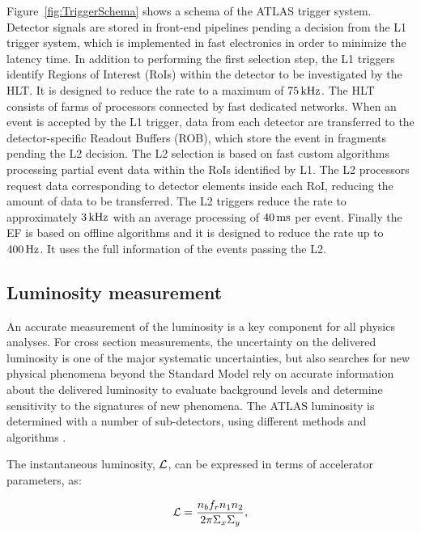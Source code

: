 Figure~\ref{fig:TriggerSchema} shows a schema of the ATLAS trigger system.
Detector signals are stored in front-end pipelines pending a decision from the L1 trigger system, which is implemented in fast electronics in order to minimize the latency time.
In addition to performing the first selection step, the L1 triggers identify Regions of Interest (RoIs) within the detector to be investigated by the HLT.
It is designed to reduce the rate to a maximum of $\unit[75]{kHz}$.
The HLT consists of farms of processors connected by fast dedicated networks.
When an event is accepted by the L1 trigger, data from each detector are transferred to the detector-specific Readout Buffers (ROB), which store the event in fragments pending the L2 decision.
The L2 selection is based on fast custom algorithms processing partial event data within the RoIs identified by L1.
The L2 processors request data corresponding to detector elements inside each RoI, reducing the amount of data to be transferred.
The L2 triggers reduce the rate to approximately $\unit[3]{kHz}$ with an average processing of $\unit[40]{ms}$ per event.
Finally the EF is based on offline algorithms and it is designed to reduce the rate up to $\unit[400]{Hz}$. 
It uses the full information of the events passing the L2.


\subsection{Luminosity measurement}
    \label{subsec:LuminosityMeasurement}

An accurate measurement of the luminosity is a key component for all physics analyses. 
For cross section measurements, the uncertainty on the delivered luminosity is one of the major systematic uncertainties, but also searches for new physical phenomena beyond the Standard Model rely on accurate information about the delivered luminosity to evaluate background levels and determine sensitivity to the signatures of new phenomena.
The ATLAS luminosity is determined with a number of sub-detectors, using different methods and algorithms \cite{Aad:2013ucp}.

The instantaneous luminosity, $\mathcal{L}$, can be expressed in terms of accelerator parameters, as:

\begin{equation}
  \InstLumi = \frac{n_{b} f_{r} n_{1} n_{2}}{2\pi \Sigma_{x} \Sigma_{y}}, 
  \label{LumiDefinitionAccelerator}
\end{equation}

